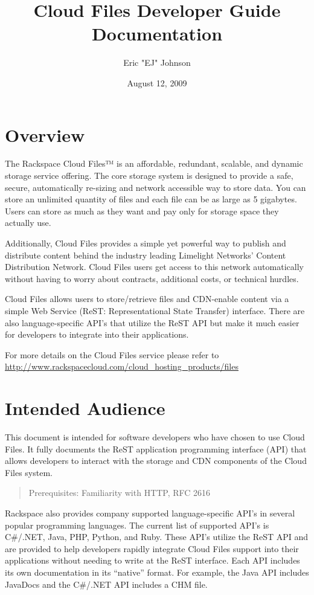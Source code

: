 \documentclass[letterpaper,10pt,english]{manual}
\title{Cloud Files Developer Guide Documentation}
\date{August 12, 2009}
\author{Eric "EJ" Johnson}
\begin{document}
\maketitle
\tableofcontents




\chapter{Overview}

The Rackspace Cloud Files™ is an affordable, redundant, scalable, and
dynamic storage service offering.  The core storage system is designed to
provide a safe, secure, automatically re-sizing and network accessible way
to store data.  You can store an unlimited quantity of files and each file
can be as large as 5 gigabytes. Users can store as much as they want and
pay only for storage space they actually use.

Additionally, Cloud Files provides a simple yet powerful way to publish
and distribute content behind the industry leading Limelight Networks'
Content Distribution Network. Cloud Files users get access to this
network automatically without having to worry about contracts, additional
costs, or technical hurdles.

Cloud Files allows users to store/retrieve files and CDN-enable content
via a simple Web Service (ReST: Representational State Transfer)
interface. There are also language-specific API’s that utilize the ReST
API but make it much easier for developers to integrate into their
applications.

For more details on the Cloud Files service please refer to
\href{http://www.rackspacecloud.com/cloud\_hosting\_products/files}{http://www.rackspacecloud.com/cloud\_hosting\_products/files}


\chapter{Intended Audience}

This document is intended for software developers who have chosen to use
Cloud Files. It fully documents the ReST application programming interface
(API) that allows developers to interact with the storage and CDN
components of the Cloud Files system.
\begin{quote}

Prerequisites: Familiarity with HTTP, RFC 2616
\end{quote}

Rackspace also provides company supported language-specific API’s in
several popular programming languages.  The current list of supported
API’s is C\#/.NET, Java, PHP, Python, and Ruby.  These API’s utilize the
ReST API and are provided to help developers rapidly integrate Cloud Files
support into their applications without needing to write at the ReST
interface.  Each API includes its own documentation in its “native”
format.  For example, the Java API includes JavaDocs and the C\#/.NET API
includes a CHM file.
\end{document}
